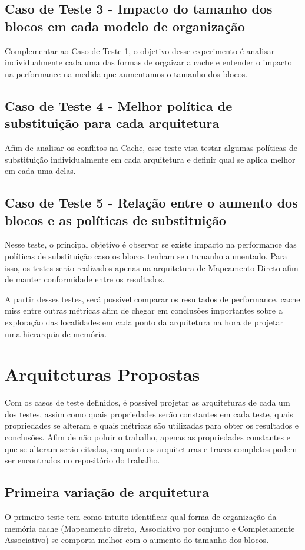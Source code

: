 \documentclass[conference]{IEEEtran}
\begin{document}
\subsection{Caso de Teste 3 - Impacto do tamanho dos blocos em cada modelo de organização}
Complementar ao Caso de Teste 1, o objetivo desse experimento é analisar individualmente cada uma das formas de orgaizar a cache e entender o impacto na performance na medida que aumentamos o tamanho dos blocos.

\subsection{Caso de Teste 4 - Melhor política de substituição para cada arquitetura}
Afim de analisar os conflitos na Cache, esse teste visa testar algumas políticas de substituição individualmente em cada arquitetura e definir qual se aplica melhor em cada uma delas.

\subsection{Caso de Teste 5 - Relação entre o aumento dos blocos e as políticas de substituição}
Nesse teste, o principal objetivo é observar se existe impacto na performance das políticas de substituição caso os blocos tenham seu tamanho aumentado. Para isso, os testes serão realizados apenas na arquitetura de Mapeamento Direto afim de manter conformidade entre os resultados.

A partir desses testes, será possível comparar os resultados de performance, cache miss entre outras métricas afim de chegar em conclusões importantes sobre a exploração das localidades em cada ponto da arquitetura na hora de projetar uma hierarquia de memória.


\section{Arquiteturas Propostas}
Com os casos de teste definidos, é possível projetar as arquiteturas de cada um dos testes, assim como quais propriedades serão constantes em cada teste, quais propriedades se alteram e quais métricas são utilizadas para obter os resultados e conclusões. Afim de não poluir o trabalho, apenas as propriedades constantes e que se alteram serão citadas, enquanto as arquiteturas e traces completos podem ser encontrados no repositório do trabalho.

\subsection{Primeira variação de arquitetura}
O primeiro teste tem como intuito identificar qual forma de organização da memória cache (Mapeamento direto, Associativo por conjunto e Completamente Associativo) se comporta melhor com o aumento do tamanho dos blocos.
\end{document}
